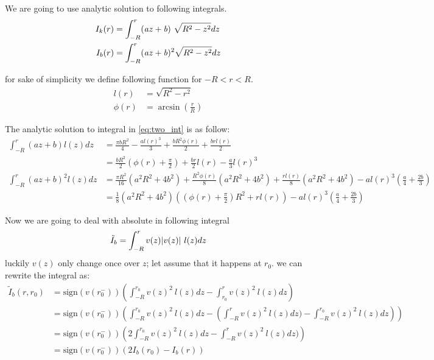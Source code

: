 \documentclass{article}
\DeclarePairedDelimiter\abs{\lvert}{\rvert}%
\begin{document}
We are going to use analytic solution to following integrals. 
\begin{align}\label{eq:two_int}
I_k(r) &=\int _{-R}^{r} ( {\it a} z+{\it b} )~ \sqrt{R^2-z^2}dz\\
I_b(r) &=\int _{-R}^{r} ( {\it a} z+{\it b} )^2 \sqrt{R^2-z^2}dz
\end{align}

for sake of simplicity we define following function for $-R<r<R$.
\begin{align}\label{eq:simplie}
l(r) &= \sqrt{R^2-r^2}\\
\phi(r) &= \arcsin(\frac{r}{R})
\end{align}

The analytic solution to integral in \eqref{eq:two_int} is as follow:
\begin{align}\label{eq:integrals}
	  \int _{-R}^{r} (az+b ) l(z)dz &=  \frac{\pi b R^2}{4} - \frac{a{l(r)}^3}{3}  +\frac{b R^2\phi(r)}{2}+ \frac{brl(r)}{2}\\
	                                &=  \frac{bR^2}{2} \left(\phi(r) + \frac{\pi}{2}\right) + \frac{br}{2} l(r) - \frac{a}{3} l(r)^3 \\
	  \int _{-R}^{r} (az+b)^2 l(z)dz &=  \frac{\pi R^2}{16}(a^2 R^2 + 4 b^2) + \frac{R^2 \phi(r)}{8}(a^2 R^2 + 4b^2) + \frac{rl(r)}{8} (a^2 R^2 + 4b^2)-
	  al(r)^3 (\frac{a}{4}+\frac{2b}{3})\\
	  &=  \frac{1}{8}(a^2 R^2 + 4 b^2) \left(\left(\phi(r)+\frac{\pi}{2}\right)R^2 + rl(r)\right) - al(r)^3 (\frac{a}{4}+\frac{2b}{3}) 
\end{align}

Now we are going to deal with absolute in following integral
\begin{align}\label{eq:two_int}
\tilde{I}_b = \int _{-R}^{r} v(z) \abs{v(z) }~l(z)dz
\end{align}
luckily $v(z)$ only change once over $z$; let assume that it happens at $r_0$. we can rewrite the integral as:
\begin{align}\label{eq:two_int}
\tilde{I}_b(r,r_0) &= \mathrm{sign}\left(v(r_0^-)\right) \left( \int _{-R}^{r_0} v(z)^2~ l(z)dz - \int _{r_0}^{r} v(z)^2~ l(z)dz \right)\\
			&= \mathrm{sign}\left(v(r_0^-)\right) \left( \int _{-R}^{r_0} v(z)^2~ l(z)dz - \left( \int _{-R}^{r} v(z)^2~ l(z)dz ) -  
			\int _{-R}^{r_0} v(z)^2~ l(z)dz \right) \right)\\
			&= \mathrm{sign}\left(v(r_0^-)\right) \left( 2 \int _{-R}^{r_0} v(z)^2~ l(z)dz - \int _{-R}^{r} v(z)^2~ l(z)dz ) \right)\\
			&= \mathrm{sign}\left(v(r_0^-)\right) \left( 2I_b(r_0) - I_b(r) \right)
\end{align}
\end{document}
